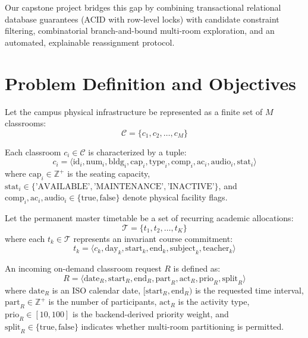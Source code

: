 \documentclass[conference]{IEEEtran}
\begin{document}
Our capstone project bridges this gap by combining transactional relational database guarantees (ACID with row-level locks) with candidate constraint filtering, combinatorial branch-and-bound multi-room exploration, and an automated, explainable reassignment protocol.

\section{Problem Definition and Objectives}
Let the campus physical infrastructure be represented as a finite set of $M$ classrooms:
\begin{equation}
\mathcal{C} = \{c_1, c_2, \dots, c_M\}
\end{equation}

Each classroom $c_i \in \mathcal{C}$ is characterized by a tuple:
\begin{equation}
c_i = \langle \text{id}_i, \text{num}_i, \text{bldg}_i, \text{cap}_i, \text{type}_i, \text{comp}_i, \text{ac}_i, \text{audio}_i, \text{stat}_i \rangle
\end{equation}
where $\text{cap}_i \in \mathbb{Z}^+$ is the seating capacity, $\text{stat}_i \in \{\text{'AVAILABLE'}, \text{'MAINTENANCE'}, \text{'INACTIVE'}\}$, and $\text{comp}_i, \text{ac}_i, \text{audio}_i \in \{\text{true}, \text{false}\}$ denote physical facility flags.

Let the permanent master timetable be a set of recurring academic allocations:
\begin{equation}
\mathcal{T} = \{t_1, t_2, \dots, t_K\}
\end{equation}
where each $t_k \in \mathcal{T}$ represents an invariant course commitment:
\begin{equation}
t_k = \langle c_k, \text{day}_k, \text{start}_k, \text{end}_k, \text{subject}_k, \text{teacher}_k \rangle
\end{equation}

An incoming on-demand classroom request $R$ is defined as:
\begin{equation}
R = \langle \text{date}_R, \text{start}_R, \text{end}_R, \text{part}_R, \text{act}_R, \text{prio}_R, \text{split}_R \rangle
\end{equation}
where $\text{date}_R$ is an ISO calendar date, $[\text{start}_R, \text{end}_R)$ is the requested time interval, $\text{part}_R \in \mathbb{Z}^+$ is the number of participants, $\text{act}_R$ is the activity type, $\text{prio}_R \in [10, 100]$ is the backend-derived priority weight, and $\text{split}_R \in \{\text{true}, \text{false}\}$ indicates whether multi-room partitioning is permitted.
\end{document}
